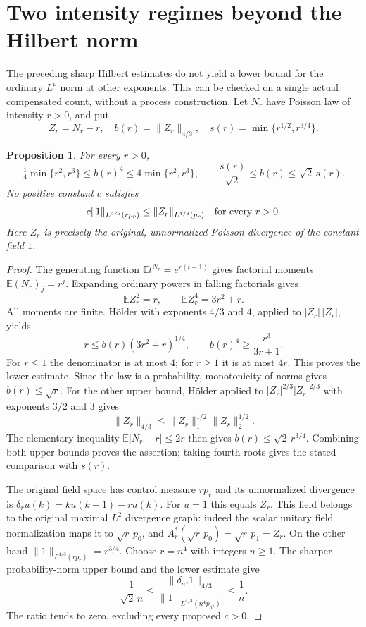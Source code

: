 \documentclass[11pt]{article}
\newtheorem{proposition}[theorem]{Proposition}
\newcommand{\E}{\mathbb E}\newcommand{\Ent}{\operatorname{Ent}}
\begin{document}
\section{Two intensity regimes beyond the Hilbert norm}
The preceding sharp Hilbert estimates do not yield a lower bound for
the ordinary $L^p$ norm at other exponents. This can be checked on a
single actual compensated count, without a process construction.
Let $N_r$ have Poisson law of intensity $r>0$, and put
\[
 Z_r=N_r-r,\quad b(r)=\|Z_r\|_{4/3},\quad
 s(r)=\min\{r^{1/2},r^{3/4}\}.
\]
\begin{proposition}\label{prop:two-regime}
For every $r>0$,
\[
 \tfrac14\min\{r^2,r^3\}\leq b(r)^4
 \leq4\min\{r^2,r^3\},\qquad
 \frac{s(r)}{\sqrt2}\leq b(r)\leq\sqrt2\,s(r).
\]
No positive constant $c$ satisfies
\[
 c\|1\|_{L^{4/3}(r p_r)}\leq\|Z_r\|_{L^{4/3}(p_r)}
 \quad\hbox{for every }r>0.
\]
Here $Z_r$ is precisely the original, unnormalized Poisson divergence
of the constant field $1$.
\end{proposition}
\begin{proof}
The generating function $\E t^{N_r}=e^{r(t-1)}$ gives factorial
moments $\E(N_r)_j=r^j$. Expanding ordinary powers in falling
factorials gives
\[
 \E Z_r^2=r,\qquad \E Z_r^4=3r^2+r.
\]
All moments are finite. H\"older with exponents $4/3$ and $4$, applied
to $|Z_r|\,|Z_r|$, yields
\[
 r\leq b(r)(3r^2+r)^{1/4},\qquad
 b(r)^4\geq\frac{r^3}{3r+1}.
\]
For $r\leq1$ the denominator is at most $4$; for $r\geq1$ it is
at most $4r$. This proves the lower estimate. Since the law is a
probability, monotonicity of norms gives $b(r)\leq\sqrt r$.
For the other upper bound, H\"older applied to
$|Z_r|^{2/3}|Z_r|^{2/3}$ with exponents $3/2$ and $3$ gives
\[
 \|Z_r\|_{4/3}\leq\|Z_r\|_1^{1/2}\|Z_r\|_2^{1/2}.
\]
The elementary inequality $\E|N_r-r|\leq2r$ then gives
$b(r)\leq\sqrt2\,r^{3/4}$. Combining both upper bounds proves
the assertion; taking fourth roots gives the stated comparison with
$s(r)$.

The original field space has control measure $r p_r$ and its
unnormalized divergence is
$\delta_r u(k)=k u(k-1)-r u(k)$.
For $u=1$ this equals $Z_r$. This field belongs to the original
maximal $L^2$ divergence graph: indeed the scalar unitary field
normalization maps it to $\sqrt r\,p_0$, and
$A_r^*(\sqrt r\,p_0)=\sqrt r\,p_1=Z_r$.
On the other hand
$\|1\|_{L^{4/3}(r p_r)}=r^{3/4}$.
Choose $r=n^4$ with integers $n\geq1$. The sharper probability-norm
upper bound and the lower estimate give
\[
 \frac{1}{\sqrt2\,n}\leq
 \frac{\|\delta_{n^4}1\|_{4/3}}
 {\|1\|_{L^{4/3}(n^4p_{n^4})}}\leq\frac1n.
\]
The ratio tends to zero, excluding every proposed $c>0$.
\end{proof}
\end{document}
